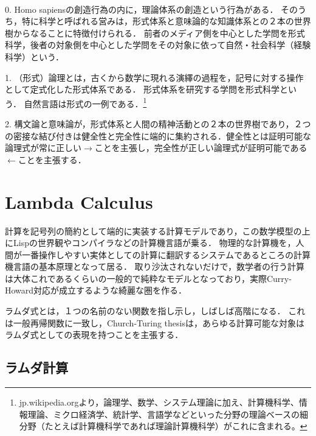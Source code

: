 \documentclass[uplatex, dvipdfmx]{jsreport}
\begin{document}
\begin{definition}　

    0. Homo sapiensの創造行為の内に，理論体系の創造という行為がある．
    そのうち，特に科学と呼ばれる営みは，形式体系と意味論的な知識体系との２本の世界樹からなることに特徴付けられる．
    前者のメディア側を中心とした学問を形式科学，後者の対象側を中心とした学問をその対象に依って自然・社会科学（経験科学）という．

    1. （形式）論理とは，古くから数学に現れる演繹の過程を，記号に対する操作として定式化した形式体系である．
    形式体系を研究する学問を形式科学という．
    自然言語は形式の一例である．\footnote{jp.wikipedia.orgより，論理学、数学、システム理論に加え、計算機科学、情報理論、ミクロ経済学、統計学、言語学などといった分野の理論ベースの細分野（たとえば計算機科学であれば理論計算機科学）がこれに含まれる。}

    2. 構文論と意味論が，形式体系と人間の精神活動との２本の世界樹であり，２つの密接な結び付きは健全性と完全性に端的に集約される．健全性とは証明可能な論理式が常に正しい$\rightarrow$ことを主張し，完全性が正しい論理式が証明可能である$\leftarrow$ことを主張する．
\end{definition}

\section{Lambda Calculus}
計算を記号列の簡約として端的に実装する計算モデルであり，この数学模型の上にLispの世界観やコンパイラなどの計算機言語が乗る．
物理的な計算機を，人間が一番操作しやすい実体としての計算に翻訳するシステムであるところの計算機言語の基本原理となって居る．
取り沙汰されないだけで，数学者の行う計算は大体これであるくらいの一般的で純粋なモデルとなっており，実際Curry-Howard対応が成立するような綺麗な圏を作る．

ラムダ式とは，１つの名前のない関数を指し示し，しばしば高階になる．
これは一般再帰関数に一致し，Church-Turing thesisは，あらゆる計算可能な対象はラムダ式としての表現を持つことを主張する．

\subsection{ラムダ計算}
\end{document}
